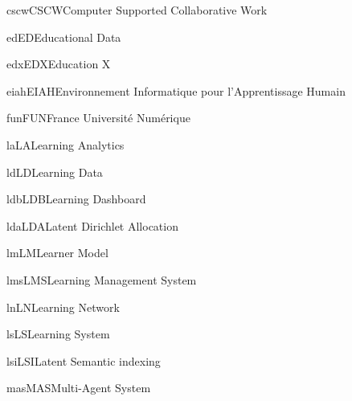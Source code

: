 \newacronym
{cscw}{CSCW}{Computer Supported Collaborative Work}

\newacronym
{ed}{ED}{Educational Data}

\newacronym
{edx}{EDX}{Education X}


\newacronym
{eiah}{EIAH}{Environnement Informatique pour l'Apprentissage Humain}

\newacronym
{fun}{FUN}{France Université Numérique}



\newacronym
{la}{LA}{Learning Analytics}

\newacronym
{ld}{LD}{Learning Data}

\newacronym
{ldb}{LDB}{Learning Dashboard}

\newacronym
{lda}{LDA}{Latent Dirichlet Allocation}

\newacronym
{lm}{LM}{Learner Model}

\newacronym
{lms}{LMS}{Learning Management System}

\newacronym
{ln}{LN}{Learning Network}

\newacronym
{ls}{LS}{Learning System}

\newacronym
{lsi}{LSI}{Latent Semantic indexing}

\newacronym
{mas}{MAS}{Multi-Agent System}

